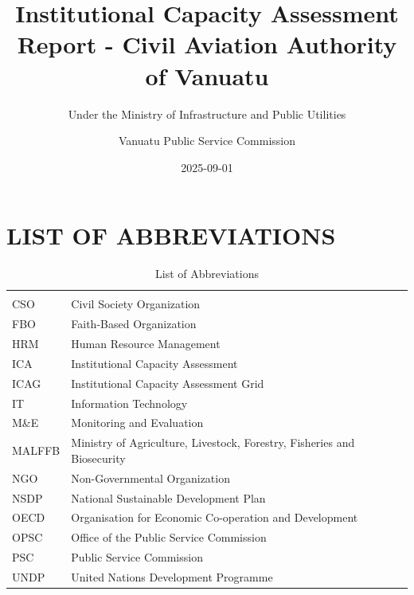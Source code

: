 \documentclass[
  10pt,
]{report}
\title{Institutional Capacity Assessment Report - Civil Aviation
Authority of Vanuatu}
\subtitle{Under the Ministry of Infrastructure and Public Utilities}
\author{Vanuatu Public Service Commission}
\date{2025-09-01}
\renewcommand*\contentsname{Table of contents}
\newcommand\contentsname{Table of contents}
\begin{document}
\maketitle

\renewcommand*\contentsname{Table of contents}
{
\hypersetup{linkcolor=}
\setcounter{tocdepth}{2}
\tableofcontents
}
\listoffigures
\listoftables

\maketitle

\chapter{LIST OF ABBREVIATIONS}\label{list-of-abbreviations}

\begingroup\fontsize{8}{10}\selectfont

\begin{longtable}[t]{>{\raggedright\arraybackslash}p{3cm}>{\raggedright\arraybackslash}p{10cm}}

\caption{\label{tbl-abbreviations}List of Abbreviations}

\tabularnewline

\\
\toprule
\cellcolor[HTML]{006498}{\textcolor{white}{\textbf{Abbreviation}}} & \cellcolor[HTML]{006498}{\textcolor{white}{\textbf{Definition}}}\\
\midrule
CSO & Civil Society Organization\\
FBO & Faith-Based Organization\\
HRM & Human Resource Management\\
ICA & Institutional Capacity Assessment\\
ICAG & Institutional Capacity Assessment Grid\\
\addlinespace
IT & Information Technology\\
M\&E & Monitoring and Evaluation\\
MALFFB & Ministry of Agriculture, Livestock, Forestry, Fisheries and Biosecurity\\
NGO & Non-Governmental Organization\\
NSDP & National Sustainable Development Plan\\
\addlinespace
OECD & Organisation for Economic Co-operation and Development\\
OPSC & Office of the Public Service Commission\\
PSC & Public Service Commission\\
UNDP & United Nations Development Programme\\
\bottomrule

\end{longtable}
\end{document}
